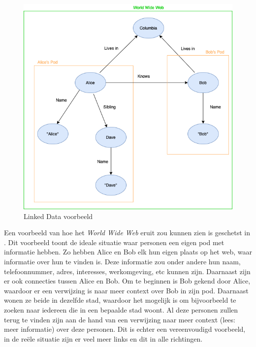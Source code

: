 \begin{figure}[ht!]
    \centering
    \includegraphics[width=\linewidth]{images/Linked Data Example.png}
    \caption{Linked Data voorbeeld}
    \label{fig:linked_data_example}
\end{figure}

Een voorbeeld van hoe het \textit{World Wide Web} eruit zou kunnen zien is geschetst in . Dit voorbeeld toont de ideale situatie waar personen een eigen pod met informatie hebben. Zo hebben Alice en Bob elk hun eigen plaats op het web, waar informatie over hun te vinden is. Deze informatie zou onder andere hun naam, telefoonnummer, adres, interesses, werkomgeving, etc kunnen zijn. Daarnaast zijn er ook connecties tussen Alice en Bob. Om te beginnen is Bob gekend door Alice, waardoor er een verwijzing is naar meer context over Bob in zijn pod. Daarnaast wonen ze beide in dezelfde stad, waardoor het mogelijk is om bijvoorbeeld te zoeken naar iedereen die in een bepaalde stad woont. Al deze personen zullen terug te vinden zijn aan de hand van een verwijzing naar meer context (lees: meer informatie) over deze personen. Dit is echter een vereenvoudigd voorbeeld, in de reële situatie zijn er veel meer links en dit in alle richtingen.